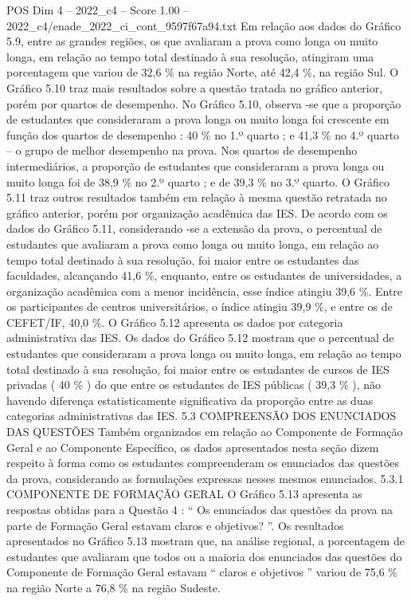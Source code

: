 \begin{textsample}{POS Dim 4 – 2022\_c4 – Score 1.00 – 2022\_c4/enade\_2022\_ci\_cont\_9597f67a94.txt}
Em relação aos dados do Gráfico 5.9, entre as grandes regiões, os que avaliaram a prova como longa ou muito longa, em relação ao tempo total destinado à sua resolução, atingiram uma porcentagem que variou de 32,6 \% na região Norte, até 42,4 \%, na região Sul.
O Gráfico 5.10 traz mais resultados sobre a questão tratada no gráfico anterior, porém por quartos de desempenho.
No Gráfico 5.10, observa -se que a proporção de estudantes que consideraram a prova longa ou muito longa foi crescente em função dos quartos de desempenho : 40 \% no 1.º quarto ; e 41,3 \% no 4.º quarto – o grupo de melhor desempenho na prova.
Nos quartos de desempenho intermediários, a proporção de estudantes que consideraram a prova longa ou muito longa foi de 38,9 \% no 2.º quarto ; e de 39,3 \% no 3.º quarto.
O Gráfico 5.11 traz outros resultados também em relação à mesma questão retratada no gráfico anterior, porém por organização acadêmica das IES.
De acordo com os dados do Gráfico 5.11, considerando -se a extensão da prova, o percentual de estudantes que avaliaram a prova como longa ou muito longa, em relação ao tempo total destinado à sua resolução, foi maior entre os estudantes das faculdades, alcançando 41,6 \%, enquanto, entre os estudantes de universidades, a organização acadêmica com a menor incidência, esse índice atingiu 39,6 \%.
Entre os participantes de centros universitários, o índice atingiu 39,9 \%, e entre os de CEFET/IF, 40,0 \%.
O Gráfico 5.12 apresenta os dados por categoria administrativa das IES.
Os dados do Gráfico 5.12 mostram que o percentual de estudantes que consideraram a prova longa ou muito longa, em relação ao tempo total destinado à sua resolução, foi maior entre os estudantes de cursos de IES privadas ( 40 \% ) do que entre os estudantes de IES públicas ( 39,3 \% ), não havendo diferença estatisticamente significativa da proporção entre as duas categorias administrativas das IES. 5.3 COMPREENSÃO DOS ENUNCIADOS DAS QUESTÕES Também organizados em relação ao Componente de Formação Geral e ao Componente Específico, os dados apresentados nesta seção dizem respeito à forma como os estudantes compreenderam os enunciados das questões da prova, considerando as formulações expressas nesses mesmos enunciados. 5.3.1 COMPONENTE DE FORMAÇÃO GERAL O Gráfico 5.13 apresenta as respostas obtidas para a Questão 4 : “ Os enunciados das questões da prova na parte de Formação Geral estavam claros e objetivos? ”.
Os resultados apresentados no Gráfico 5.13 mostram que, na análise regional, a porcentagem de estudantes que avaliaram que todos ou a maioria dos enunciados das questões do Componente de Formação Geral estavam “ claros e objetivos ” variou de 75,6 \% na região Norte a 76,8 \% na região Sudeste.

\end{textsample}

